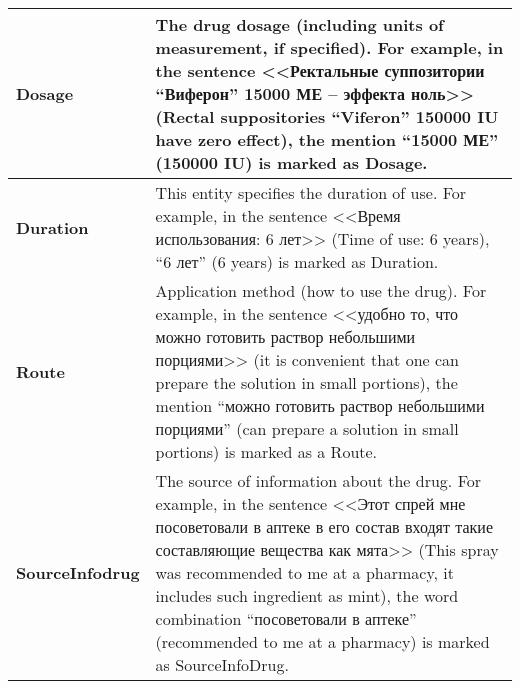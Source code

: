 \begin{tabular}{|p{}|p{}|}
\\ \hline
\textbf{Dosage}         & The drug dosage (including units of measurement, if specified). For example, in the sentence <<Ректальные суппозитории ``Виферон'' 15000 МЕ -- эффекта ноль>> (Rectal suppositories “Viferon” 150000 IU have zero effect), the mention ``15000 МЕ'' (150000 IU) is marked as Dosage.
\\ \hline
\textbf{Duration}       & This entity specifies the duration of use. For example, in the sentence <<Время использования: 6 лет>> (Time of use: 6 years), ``6 лет'' (6 years) is marked as Duration.
\\ \hline
\textbf{Route}          & Application method (how to use the drug). For example, in the sentence <<удобно то, что можно готовить раствор небольшими порциями>> (it is convenient that one can prepare the solution in small portions), the mention ``можно готовить раствор небольшими порциями'' (can prepare a solution in small portions) is marked as a Route.
\\ \hline
\textbf{SourceInfodrug} & The source of information about the drug. For example, in the sentence <<Этот спрей мне посоветовали в аптеке в его состав входят такие составляющие вещества как мята>> (This spray was recommended to me at a pharmacy, it includes such ingredient as mint), the word combination ``посоветовали в аптеке'' (recommended to me at a pharmacy) is marked as SourceInfoDrug.
\\ \hline
\end{tabular}
